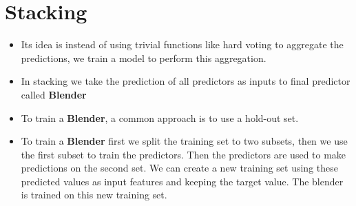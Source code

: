 \documentclass{article}
\begin{document}
	\section{Stacking} 
	\begin{itemize}
		\item Its idea is instead of using trivial functions like hard voting to aggregate the predictions, we train a model to perform this aggregation.
		\item In stacking we take the prediction of all predictors as inputs to final predictor called \textbf{Blender}
		\item To train a \textbf{Blender}, a common approach is to use a hold-out set.
		\item To train a \textbf{Blender} first we split the training set to two subsets, then we use the first subset to train the predictors. Then the predictors are used to make predictions on the second set. We can create a new training set using these predicted values as input features and keeping the target value. The blender is trained on this new training set.
	\end{itemize}
\end{document}
